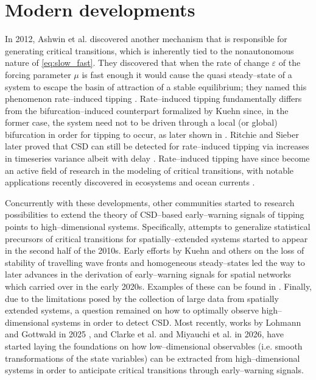 \section{Modern developments}
In 2012, Ashwin et al. discovered another mechanism that is responsible for generating critical transitions, which is inherently tied to the nonautonomous nature of \eqref{eq:slow_fast}.
They discovered that when the rate of change $\varepsilon$ of the forcing parameter $\mu$ is fast enough it would cause the quasi steady--state of a system to escape the basin of attraction of a stable equilibrium; they named this phenomenon rate--induced tipping \cite{Ashwin2012}.
Rate--induced tipping fundamentally differs from the bifurcation--induced counterpart formalized by Kuehn since, in the former case, the system need not to be driven through a local (or global) bifurcation in order for tipping to occur, as later shown in \cite{Ashwin2017,Wieczorek2023}.
Ritchie and Sieber later proved that CSD can still be detected for rate--induced tipping via increases in timeseries variance albeit with delay \cite{Ritchie2016}.
Rate--induced tipping have since become an active field of research in the modeling of critical transitions, with notable applications recently discovered in ecosystems \cite{OSullivan2023,Kumar2026} and ocean currents \cite{Alkhayuon2019,Lohmann2021,Chapman2025}.

Concurrently with these developments, other communities started to research possibilities to extend the theory of CSD--based early--warning signals of tipping points to high--dimensional systems.
Specifically, attempts to generalize statistical precursors of critical transitions for spatially--extended systems started to appear in the second half of the 2010s.
Early efforts by Kuehn and others on the loss of stability of travelling wave fronts \cite{Kuehn2012} and homogeneous steady--states \cite{Gowda2015} led the way to later advances in the derivation of early--warning signals for spatial networks which carried over in the early 2020s.
Examples of these can be found in \cite{Jentsch2018,Chen2019,Donovan2022,Deb2024,Morr2024b}.
Finally, due to the limitations posed by the collection of large data from spatially extended systems, a question remained on how to optimally observe high--dimensional systems in order to detect CSD. 
Most recently, works by Lohmann and Gottwald in 2025 \cite{Lohmann2025}, and Clarke et al. \cite{Clarke2026} and Miyauchi et al. \cite{Miyauchi2026} in 2026, have started laying the foundations on how low--dimensional observables (i.e. smooth transformations of the state variables) can be extracted from high--dimensional systems in order to anticipate critical transitions through early--warning signals.

